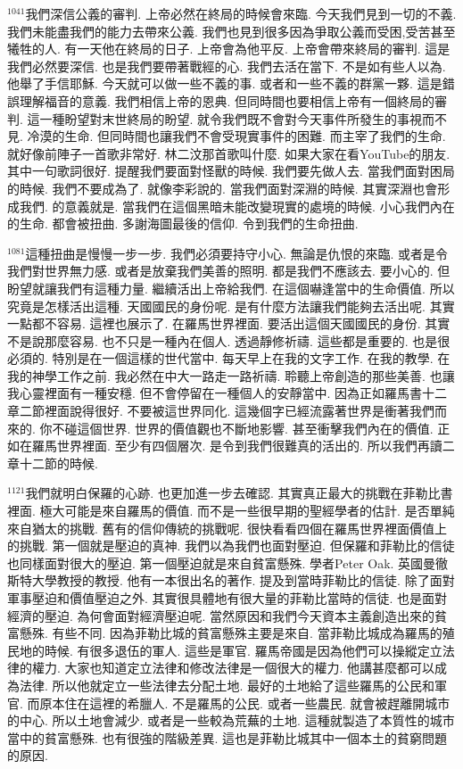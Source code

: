 \documentclass{book}
\begin{document}
$^{1041}$我們深信公義的審判.
上帝必然在終局的時候會來臨.
今天我們見到一切的不義.
我們未能盡我們的能力去帶來公義.
我們也見到很多因為爭取公義而受困,受苦甚至犧牲的人.
有一天他在終局的日子.
上帝會為他平反.
上帝會帶來終局的審判.
這是我們必然要深信.
也是我們要帶著戰經的心.
我們去活在當下.
不是如有些人以為.
他舉了手信耶穌.
今天就可以做一些不義的事.
或者和一些不義的群黨一夥.
這是錯誤理解福音的意義.
我們相信上帝的恩典.
但同時間也要相信上帝有一個終局的審判.
這一種盼望對末世終局的盼望.
就令我們既不會對今天事件所發生的事視而不見.
冷漠的生命.
但同時間也讓我們不會受現實事件的困難.
而主宰了我們的生命.
就好像前陣子一首歌非常好.
林二汶那首歌叫什麼.
如果大家在看YouTube的朋友.
其中一句歌詞很好.
提醒我們要面對怪獸的時候.
我們要先做人去.
當我們面對困局的時候.
我們不要成為了.
就像李彩說的.
當我們面對深淵的時候.
其實深淵也會形成我們.
的意義就是.
當我們在這個黑暗未能改變現實的處境的時候.
小心我們內在的生命.
都會被扭曲.
多謝海圖最後的信仰.
令到我們的生命扭曲.

$^{1081}$這種扭曲是慢慢一步一步.
我們必須要持守小心.
無論是仇恨的來臨.
或者是令我們對世界無力感.
或者是放棄我們美善的照明.
都是我們不應該去.
要小心的.
但盼望就讓我們有這種力量.
繼續活出上帝給我們.
在這個嚇逢當中的生命價值.
所以究竟是怎樣活出這種.
天國國民的身份呢.
是有什麼方法讓我們能夠去活出呢.
其實一點都不容易.
這裡也展示了.
在羅馬世界裡面.
要活出這個天國國民的身份.
其實不是說那麼容易.
也不只是一種內在個人.
透過靜修祈禱.
這些都是重要的.
也是很必須的.
特別是在一個這樣的世代當中.
每天早上在我的文字工作.
在我的教學.
在我的神學工作之前.
我必然在中大一路走一路祈禱.
聆聽上帝創造的那些美善.
也讓我心靈裡面有一種安穩.
但不會停留在一種個人的安靜當中.
因為正如羅馬書十二章二節裡面說得很好.
不要被這世界同化.
這幾個字已經流露著世界是衝著我們而來的.
你不碰這個世界.
世界的價值觀也不斷地影響.
甚至衝擊我們內在的價值.
正如在羅馬世界裡面.
至少有四個層次.
是令到我們很難真的活出的.
所以我們再讀二章十二節的時候.

$^{1121}$我們就明白保羅的心跡.
也更加進一步去確認.
其實真正最大的挑戰在菲勒比書裡面.
極大可能是來自羅馬的價值.
而不是一些很早期的聖經學者的估計.
是否單純來自猶太的挑戰.
舊有的信仰傳統的挑戰呢.
很快看看四個在羅馬世界裡面價值上的挑戰.
第一個就是壓迫的真神.
我們以為我們也面對壓迫.
但保羅和菲勒比的信徒也同樣面對很大的壓迫.
第一個壓迫就是來自貧富懸殊.
學者Peter Oak.
英國曼徹斯特大學教授的教授.
他有一本很出名的著作.
提及到當時菲勒比的信徒.
除了面對軍事壓迫和價值壓迫之外.
其實很具體地有很大量的菲勒比當時的信徒.
也是面對經濟的壓迫.
為何會面對經濟壓迫呢.
當然原因和我們今天資本主義創造出來的貧富懸殊.
有些不同.
因為菲勒比城的貧富懸殊主要是來自.
當菲勒比城成為羅馬的殖民地的時候.
有很多退伍的軍人.
這些是軍官.
羅馬帝國是因為他們可以操縱定立法律的權力.
大家也知道定立法律和修改法律是一個很大的權力.
他講甚麼都可以成為法律.
所以他就定立一些法律去分配土地.
最好的土地給了這些羅馬的公民和軍官.
而原本住在這裡的希臘人.
不是羅馬的公民.
或者一些農民.
就會被趕離開城市的中心.
所以土地會減少.
或者是一些較為荒蕪的土地.
這種就製造了本質性的城市當中的貧富懸殊.
也有很強的階級差異.
這也是菲勒比城其中一個本土的貧窮問題的原因.
\end{document}
